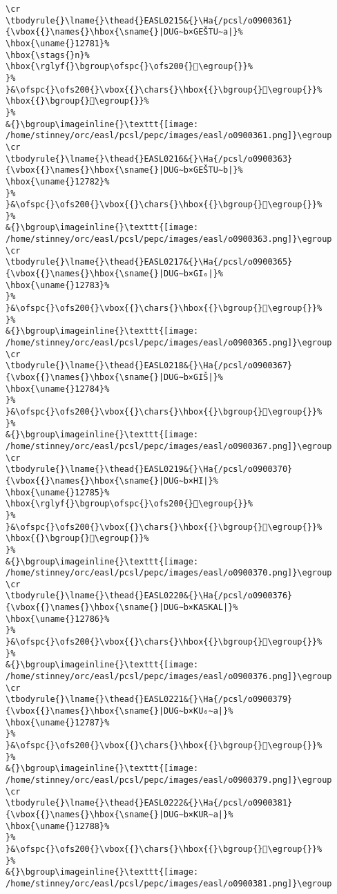 \begin{verbatim}
\cr
\tbodyrule{}\lname{}\thead{}EASL0215&{}\Ha{/pcsl/o0900361}{\vbox{{}\names{}\hbox{\sname{}|DUG∼b×GEŠTU∼a|}%
\hbox{\uname{}12781}%
\hbox{\stags{}n}%
\hbox{\rglyf{}\bgroup\ofspc{}\ofs200{}𒞁\egroup{}}%
}%
}&\ofspc{}\ofs200{}\vbox{{}\chars{}\hbox{{}\bgroup{}𒞰\egroup{}}%
\hbox{{}\bgroup{}𒞁\egroup{}}%
}%
&{}\bgroup\imageinline{}\texttt{[image: /home/stinney/orc/easl/pcsl/pepc/images/easl/o0900361.png]}\egroup
\cr
\tbodyrule{}\lname{}\thead{}EASL0216&{}\Ha{/pcsl/o0900363}{\vbox{{}\names{}\hbox{\sname{}|DUG∼b×GEŠTU∼b|}%
\hbox{\uname{}12782}%
}%
}&\ofspc{}\ofs200{}\vbox{{}\chars{}\hbox{{}\bgroup{}𒞂\egroup{}}%
}%
&{}\bgroup\imageinline{}\texttt{[image: /home/stinney/orc/easl/pcsl/pepc/images/easl/o0900363.png]}\egroup
\cr
\tbodyrule{}\lname{}\thead{}EASL0217&{}\Ha{/pcsl/o0900365}{\vbox{{}\names{}\hbox{\sname{}|DUG∼b×GI₆|}%
\hbox{\uname{}12783}%
}%
}&\ofspc{}\ofs200{}\vbox{{}\chars{}\hbox{{}\bgroup{}𒞃\egroup{}}%
}%
&{}\bgroup\imageinline{}\texttt{[image: /home/stinney/orc/easl/pcsl/pepc/images/easl/o0900365.png]}\egroup
\cr
\tbodyrule{}\lname{}\thead{}EASL0218&{}\Ha{/pcsl/o0900367}{\vbox{{}\names{}\hbox{\sname{}|DUG∼b×GIŠ|}%
\hbox{\uname{}12784}%
}%
}&\ofspc{}\ofs200{}\vbox{{}\chars{}\hbox{{}\bgroup{}𒞄\egroup{}}%
}%
&{}\bgroup\imageinline{}\texttt{[image: /home/stinney/orc/easl/pcsl/pepc/images/easl/o0900367.png]}\egroup
\cr
\tbodyrule{}\lname{}\thead{}EASL0219&{}\Ha{/pcsl/o0900370}{\vbox{{}\names{}\hbox{\sname{}|DUG∼b×HI|}%
\hbox{\uname{}12785}%
\hbox{\rglyf{}\bgroup\ofspc{}\ofs200{}𒞅\egroup{}}%
}%
}&\ofspc{}\ofs200{}\vbox{{}\chars{}\hbox{{}\bgroup{}𒞱\egroup{}}%
\hbox{{}\bgroup{}𒞅\egroup{}}%
}%
&{}\bgroup\imageinline{}\texttt{[image: /home/stinney/orc/easl/pcsl/pepc/images/easl/o0900370.png]}\egroup
\cr
\tbodyrule{}\lname{}\thead{}EASL0220&{}\Ha{/pcsl/o0900376}{\vbox{{}\names{}\hbox{\sname{}|DUG∼b×KASKAL|}%
\hbox{\uname{}12786}%
}%
}&\ofspc{}\ofs200{}\vbox{{}\chars{}\hbox{{}\bgroup{}𒞆\egroup{}}%
}%
&{}\bgroup\imageinline{}\texttt{[image: /home/stinney/orc/easl/pcsl/pepc/images/easl/o0900376.png]}\egroup
\cr
\tbodyrule{}\lname{}\thead{}EASL0221&{}\Ha{/pcsl/o0900379}{\vbox{{}\names{}\hbox{\sname{}|DUG∼b×KU₆∼a|}%
\hbox{\uname{}12787}%
}%
}&\ofspc{}\ofs200{}\vbox{{}\chars{}\hbox{{}\bgroup{}𒞇\egroup{}}%
}%
&{}\bgroup\imageinline{}\texttt{[image: /home/stinney/orc/easl/pcsl/pepc/images/easl/o0900379.png]}\egroup
\cr
\tbodyrule{}\lname{}\thead{}EASL0222&{}\Ha{/pcsl/o0900381}{\vbox{{}\names{}\hbox{\sname{}|DUG∼b×KUR∼a|}%
\hbox{\uname{}12788}%
}%
}&\ofspc{}\ofs200{}\vbox{{}\chars{}\hbox{{}\bgroup{}𒞈\egroup{}}%
}%
&{}\bgroup\imageinline{}\texttt{[image: /home/stinney/orc/easl/pcsl/pepc/images/easl/o0900381.png]}\egroup

\end{verbatim}
